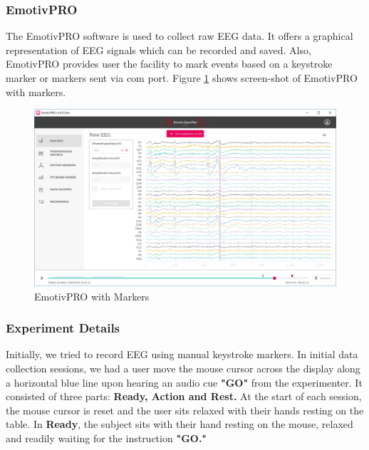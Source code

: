 \documentclass{article}
\begin{document}
\subsubsection{EmotivPRO}
The EmotivPRO software is used to collect raw EEG data. It offers a graphical representation of EEG signals which can be recorded and saved. Also, EmotivPRO provides user the facility to mark events based on a keystroke marker or markers sent via com port. Figure \ref{fig:EmotivPRO with Markers} shows screen-shot of EmotivPRO with markers.

\begin{figure}[tbp]
    \centering
    \includegraphics[scale=0.3]{Images/EmotivPRO-Markers.jpg}
    \caption{EmotivPRO with Markers}
    \label{fig:EmotivPRO with Markers}
\end{figure}

\subsubsection{Experiment Details}
Initially, we tried to record EEG using manual keystroke markers. In initial data collection sessions, we had a user move the mouse cursor across the display along a horizontal blue line upon hearing an audio cue \textbf{"GO"} from the experimenter. It consisted of three parts: \textbf{Ready, Action and Rest.} At the start of each session, the mouse cursor is reset and the user sits relaxed with their hands resting on the table. In \textbf{Ready}, the subject sits with their hand resting on the mouse, relaxed and readily waiting for the instruction \textbf{"GO."}
\end{document}
